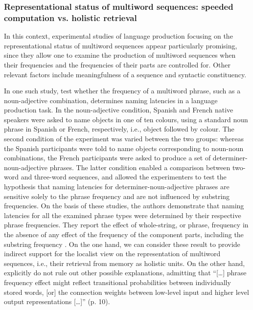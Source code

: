 \subsubsection{Representational status of multiword sequences: speeded computation vs. holistic retrieval}

In this context, experimental studies of language production focusing on the representational status of multiword sequences appear particularly promising, since they allow one to examine the production of multiword sequences when their frequencies and the frequencies of their parts are controlled for. Other relevant factors include meaningfulness of a sequence and syntactic constituency.

In one such study, \citet{janssen-barber} test whether the frequency of a multiword phrase, such as a noun-adjective combination, determines naming latencies in a language production task. In the noun-adjective condition, Spanish and French native speakers were asked to name objects in one of ten colours, using a standard noun phrase in Spanish or French, respectively, i.e., object followed by colour. The second condition of the experiment was varied between the two groups: whereas the Spanish participants were told to name objects corresponding to noun-noun combinations, the French participants were asked to produce a set of determiner-noun-adjective phrases. The latter condition enabled a comparison between two-word and three-word sequences, and allowed the experimenters to test the hypothesis that naming latencies for determiner-noun-adjective phrases are sensitive solely to the phrase frequency and are not influenced by substring frequencies. On the basis of these studies, the authors demonstrate that naming latencies for all the examined phrase types were determined by their respective phrase frequencies. They report the effect of whole-string, or phrase, frequency in the absence of any effect of the frequency of the component parts, including the substring frequency \citep[see][for a similar result observed in language comprehension]{tremblay-etal11}. On the one hand, we can consider these result to provide indirect support for the localist view on the representation of multiword sequences, i.e., their retrieval from memory as holistic units. On the other hand, \citeauthor{janssen-barber} explicitly do not rule out other possible explanations, admitting that ``[\dots] phrase frequency effect might reflect transitional probabilities between individually stored words, [or] the connection weights between low-level input and higher level output representations [\dots]'' (p. 10).

